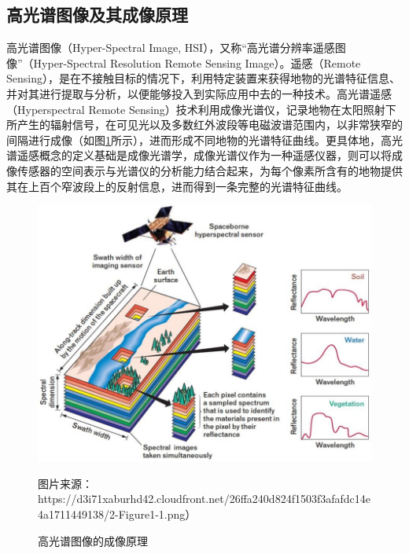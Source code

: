 \documentclass[12pt, a4paper]{article}
\begin{document}
\subsection{高光谱图像及其成像原理}
\par 高光谱图像（Hyper-Spectral Image, HSI），又称“高光谱分辨率遥感图像”（Hyper-Spectral Resolution Remote Sensing Image）。遥感（Remote Sensing），是在不接触目标的情况下，利用特定装置来获得地物的光谱特征信息、并对其进行提取与分析，以便能够投入到实际应用中去的一种技术\cite{whatishsi}。高光谱遥感（Hyperspectral  Remote Sensing）技术利用成像光谱仪，记录地物在太阳照射下所产生的辐射信号，在可见光以及多数红外波段等电磁波谱范围内，以非常狭窄的间隔进行成像（如图\ref{img-pricipleofphotograph}所示），进而形成不同地物的光谱特征曲线。更具体地，高光谱遥感概念的定义基础是成像光谱学，成像光谱仪作为一种遥感仪器，则可以将成像传感器的空间表示与光谱仪的分析能力结合起来，为每个像素所含有的地物提供其在上百个窄波段上的反射信息，进而得到一条完整的光谱特征曲线\cite{howtogenanhsi}。
\begin{figure}[h]
\centering
\includegraphics[scale=0.4]{img-principleofphotograph.png}
\caption{高光谱图像的成像原理}
{\scriptsize{图片来源：https://d3i71xaburhd42.cloudfront.net/26ffa240d824f1503f3afafdc14e4a1711449138/2-Figure1-1.png）}}
\label{img-pricipleofphotograph}
\end{figure}
\end{document}
